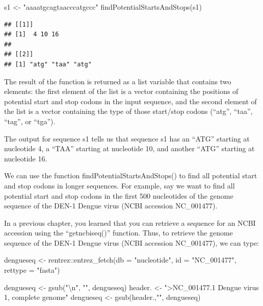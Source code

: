 \documentclass[
]{book}
\newenvironment{Shaded}{\begin{snugshade}}{\end{snugshade}}
\newcommand{\AttributeTok}[1]{\textcolor[rgb]{0.77,0.63,0.00}{#1}}
\newcommand{\FunctionTok}[1]{\textcolor[rgb]{0.00,0.00,0.00}{#1}}
\newcommand{\NormalTok}[1]{#1}
\newcommand{\OtherTok}[1]{\textcolor[rgb]{0.56,0.35,0.01}{#1}}
\newcommand{\SpecialCharTok}[1]{\textcolor[rgb]{0.00,0.00,0.00}{#1}}
\newcommand{\StringTok}[1]{\textcolor[rgb]{0.31,0.60,0.02}{#1}}
\begin{document}
\begin{Shaded}
\begin{Highlighting}[]
\NormalTok{s1 }\OtherTok{\textless{}{-}} \StringTok{"aaaatgcagtaacccatgccc"}
\FunctionTok{findPotentialStartsAndStops}\NormalTok{(s1)}
\end{Highlighting}
\end{Shaded}

\begin{verbatim}
## [[1]]
## [1]  4 10 16
## 
## [[2]]
## [1] "atg" "taa" "atg"
\end{verbatim}

The result of the function is returned as a list variable that contains two elements: the first element of the list is a vector containing the positions of potential start and stop codons in the input sequence, and the second element of the list is a vector containing the type of those start/stop codons (``atg'', ``taa'', ``tag'', or ``tga'').

The output for sequence s1 tells us that sequence s1 has an ``ATG'' starting at nucleotide 4, a ``TAA'' starting at nucleotide 10, and another ``ATG'' starting at nucleotide 16.

We can use the function findPotentialStartsAndStops() to find all potential start and stop codons in longer sequences. For example, say we want to find all potential start and stop codons in the first 500 nucleotides of the genome sequence of the DEN-1 Dengue virus (NCBI accession NC\_001477).

In a previous chapter, you learned that you can retrieve a sequence for an NCBI accession using the ``getncbiseq()'' function. Thus, to retrieve the genome sequence of the DEN-1 Dengue virus (NCBI accession NC\_001477), we can type:

\begin{Shaded}
\begin{Highlighting}[]
\NormalTok{dengueseq }\OtherTok{\textless{}{-}}\NormalTok{ rentrez}\SpecialCharTok{::}\FunctionTok{entrez\_fetch}\NormalTok{(}\AttributeTok{db =} \StringTok{"nucleotide"}\NormalTok{, }
                          \AttributeTok{id =} \StringTok{"NC\_001477"}\NormalTok{, }
                          \AttributeTok{rettype =} \StringTok{"fasta"}\NormalTok{)}

\NormalTok{dengueseq }\OtherTok{\textless{}{-}} \FunctionTok{gsub}\NormalTok{(}\StringTok{"}\SpecialCharTok{\textbackslash{}n}\StringTok{"}\NormalTok{, }\StringTok{""}\NormalTok{, dengueseq)}
\NormalTok{header. }\OtherTok{\textless{}{-}} \StringTok{"\textgreater{}NC\_001477.1 Dengue virus 1, complete genome"}
\NormalTok{dengueseq }\OtherTok{\textless{}{-}} \FunctionTok{gsub}\NormalTok{(header.,}\StringTok{""}\NormalTok{, dengueseq)}
\end{Highlighting}
\end{Shaded}
\end{document}
